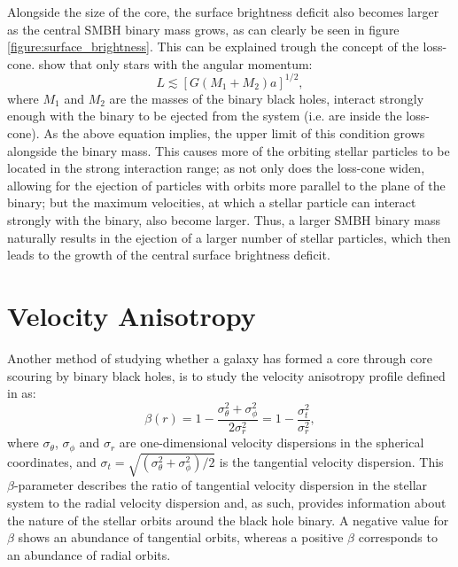 \documentclass[english, oneside]{HYgradu}
\begin{document}
Alongside the size of the core, the surface brightness deficit also becomes larger as the central SMBH binary mass grows, as can clearly be seen in figure \ref{figure:surface_brightness}. This can be explained trough the concept of the loss-cone. \cite{BinneyTremaine} show that only stars with the angular momentum:
\begin{equation}
L \lesssim [G(M_1 + M_2)a]^{1/2},
\end{equation}
where $M_1$ and $M_2$ are the masses of the binary black holes, interact strongly enough with the binary to be ejected from the system (i.e. are inside the loss-cone). As the above equation implies, the upper limit of this condition grows alongside the binary mass. This causes more of the orbiting stellar particles to be located in the strong interaction range; as not only does the loss-cone widen, allowing for the ejection of particles with orbits more parallel to the plane of the binary; but the maximum velocities, at which a stellar particle can interact strongly with the binary, also become larger. Thus, a larger SMBH binary mass naturally results in the ejection of a larger number of stellar particles, which then leads to the growth of the central surface brightness deficit.  

\section{Velocity Anisotropy}


Another method of studying whether a galaxy has formed a core through core scouring by binary black holes, is to study the velocity anisotropy profile defined in \cite{BinneyTremaine} as:
\begin{equation}
\beta(r) = 1 - \frac{\sigma_\theta^2 + \sigma_\phi^2}{2\sigma_r^2} = 1 - \frac{\sigma_t^2}{\sigma_r^2}, \label{eq:beta}
\end{equation}
where $\sigma_\theta$, $\sigma_\phi$ and $\sigma_r$ are one-dimensional velocity dispersions in the spherical coordinates, and $\sigma_t = \sqrt{(\sigma_\theta^2 + \sigma_\phi^2) / 2}$ is the tangential velocity dispersion. This $\beta$-parameter describes the ratio of tangential velocity dispersion in the stellar system to the radial velocity dispersion and, as such, provides information about the nature of the stellar orbits around the black hole binary. A negative value for $\beta$ shows an abundance of tangential orbits, whereas a positive $\beta$ corresponds to an abundance of radial orbits. 
\end{document}
